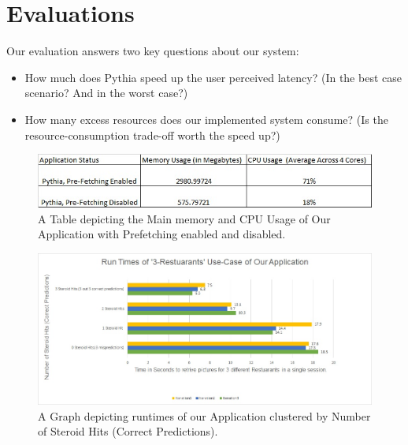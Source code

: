 \section{Evaluations}
\label{sec:eval}

Our evaluation answers two key questions about our system:
\begin{itemize}
\item How much does Pythia speed up the user perceived latency? (In the best case scenario? And in the worst case?)
\item How many excess resources does our implemented system consume? (Is the resource-consumption trade-off worth the speed up?)
\end{itemize}

\begin{figure}[h]
  \includegraphics[width=\textwidth]{figs/applicationResourceUsageTable1.jpg}
  \caption{A Table depicting the Main memory and CPU Usage of Our Application with Prefetching enabled and disabled.}
  \label{fig:table1}
\end{figure}

\begin{figure}[h]
  \includegraphics[width=\linewidth]{figs/runTimeChart1.jpg}
  \caption{A Graph depicting runtimes of our Application clustered by Number of Steroid Hits (Correct Predictions).}
  \label{fig:graph1}
\end{figure}


